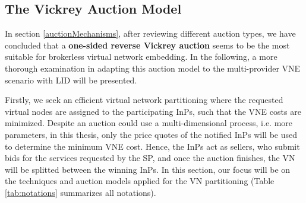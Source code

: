 \subsection{The Vickrey Auction Model} \label{vickrey}

In section \ref{auctionMechanisms}, after reviewing different auction types, we have concluded that a \textbf{one-sided reverse Vickrey auction} seems to be the most suitable for brokerless virtual network embedding. In the following, a more thorough examination in adapting this auction model to the multi-provider VNE scenario with LID will be presented.

Firstly, we seek an efficient virtual network partitioning where the requested virtual nodes are assigned to the participating InPs, such that the VNE costs are minimized. Despite an auction could use a multi-dimensional process, i.e. more parameters, in this thesis, only the price quotes of the notified InPs will be used to determine the minimum VNE cost. Hence, the InPs act as sellers, who submit bids for the services requested by the SP, and once the auction finishes, the VN will be splitted between the winning InPs. In this section, our focus will be on the techniques and auction models applied for the VN partitioning (Table \ref{tab:notations} summarizes all notations).

